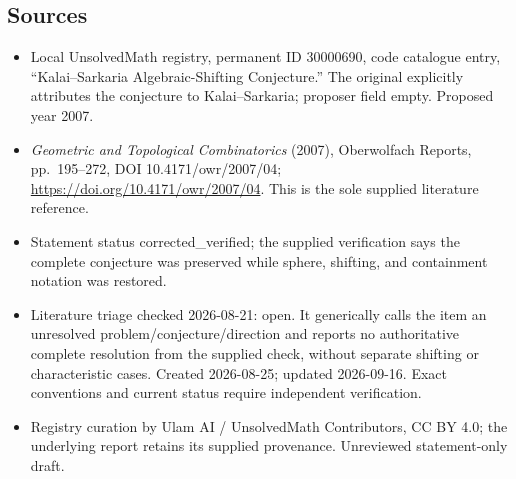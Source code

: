 \documentclass[11pt]{article}
\begin{document}
\subsection{Sources}
\begin{itemize}
\item Local UnsolvedMath registry, permanent ID 30000690, code catalogue entry, ``Kalai--Sarkaria Algebraic-Shifting Conjecture.'' The original explicitly attributes the conjecture to Kalai--Sarkaria; proposer field empty. Proposed year 2007.
\item \emph{Geometric and Topological Combinatorics} (2007), Oberwolfach Reports, pp.\ 195--272, DOI 10.4171/owr/2007/04; \url{https://doi.org/10.4171/owr/2007/04}. This is the sole supplied literature reference.
\item Statement status corrected\_verified; the supplied verification says the complete conjecture was preserved while sphere, shifting, and containment notation was restored.
\item Literature triage checked 2026-08-21: open. It generically calls the item an unresolved problem/conjecture/direction and reports no authoritative complete resolution from the supplied check, without separate shifting or characteristic cases. Created 2026-08-25; updated 2026-09-16. Exact conventions and current status require independent verification.
\item Registry curation by Ulam AI / UnsolvedMath Contributors, CC BY 4.0; the underlying report retains its supplied provenance. Unreviewed statement-only draft.
\end{itemize}
\end{document}
